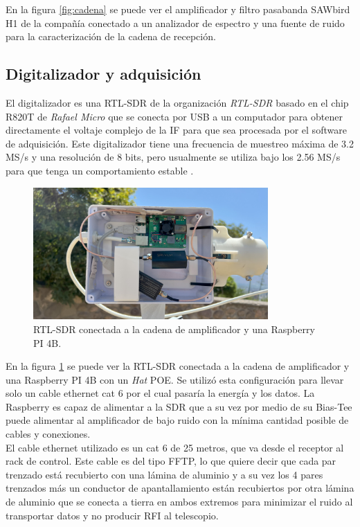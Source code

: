 En la figura \ref{fig:cadena} se puede ver el amplificador y filtro pasabanda SAWbird H1 de la compañía conectado a un analizador de espectro y una fuente de ruido para la caracterización de la cadena de recepción.\\

\subsection{Digitalizador y adquisición}

El digitalizador es una RTL-SDR de la organización \textit{RTL-SDR} basado en el chip R820T de \textit{Rafael Micro} que se conecta por USB a un computador para obtener directamente el voltaje complejo de la IF para que sea procesada por el software de adquisición. Este digitalizador tiene una frecuencia de muestreo máxima de 3.2 MS/s y una resolución de 8 bits, pero usualmente se utiliza bajo los 2.56 MS/s para que tenga un comportamiento estable \cite{RTLSDR2018}.\\

\begin{figure}
    \centering
    \includegraphics[width=0.8\textwidth]{img/rpiRtlSaw}
    \caption{RTL-SDR conectada a la cadena de amplificador y una Raspberry PI 4B.}
    \label{fig:digitalizador}
\end{figure}

En la figura \ref{fig:digitalizador} se puede ver la RTL-SDR conectada a la cadena de amplificador y una Raspberry PI 4B con un \textit{Hat} POE. Se utilizó esta configuración para llevar solo un cable ethernet cat 6 por el cual pasaría la energía y los datos. La Raspberry es capaz de alimentar a la SDR que a su vez por medio de su Bias-Tee puede alimentar al amplificador de bajo ruido con la mínima cantidad posible de cables y conexiones.\\

El cable ethernet utilizado es un cat 6 de 25 metros, que va desde el receptor al rack de control. Este cable es del tipo FFTP, lo que quiere decir que cada par trenzado está recubierto con una lámina de aluminio y a su vez los 4 pares trenzados más un conductor de apantallamiento están recubiertos por otra lámina de aluminio que se conecta a tierra en ambos extremos para minimizar el ruido al transportar datos y no producir RFI al telescopio.\\

